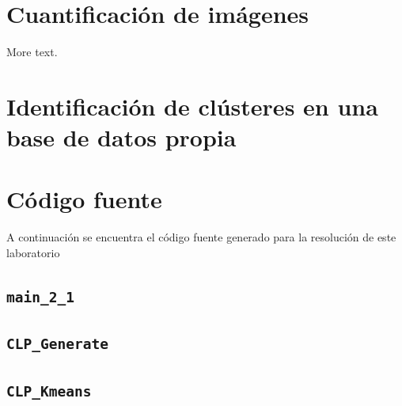 \documentclass[11pt]{article} %
\begin{document}
\clearpage

\section{Cuantificación de imágenes}

More text.

\section{Identificación de clústeres en una base de datos propia}

\clearpage

\section{Código fuente}
\label{sec:src_code}

A continuación se encuentra el código fuente generado para la resolución de
este laboratorio

\subsection{\texttt{main\_2\_1}}
\label{src:main:21}



\subsection{\texttt{CLP\_Generate}}
\label{src:fun:generate}



\subsection{\texttt{CLP\_Kmeans}}
\label{src:fun:kmeans}


\end{document}
